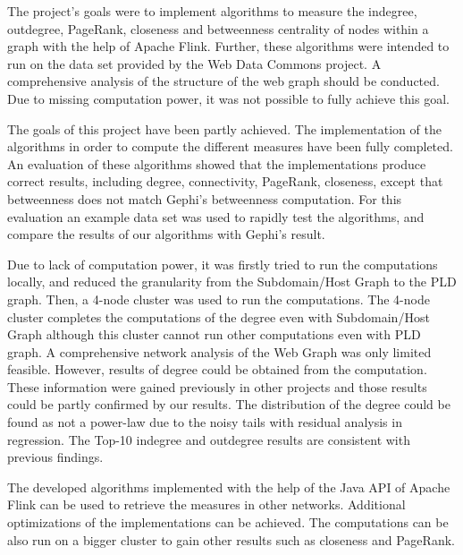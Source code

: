 The project's goals were to implement algorithms to measure the indegree, outdegree, PageRank, closeness and betweenness centrality of nodes within a graph with the  help of Apache Flink. Further, these algorithms were intended to run on the data set provided by the Web Data Commons project. A comprehensive analysis of the structure of the web graph should be conducted. Due to missing computation power, it was not possible to fully achieve this goal.

The goals of this project have been partly achieved. The implementation of the algorithms in order to compute the different measures have been fully completed. An evaluation of these algorithms showed that the implementations produce correct results, including degree, connectivity, PageRank, closeness, except that betweenness does not match Gephi's betweenness computation. For this evaluation an example data set was used to rapidly test the algorithms, and compare the results of our algorithms with Gephi's result. 

Due to lack of computation power, it was firstly tried to run the computations locally, and reduced the granularity from the Subdomain/Host Graph to the PLD graph. Then, a 4-node cluster was used to run the computations. The 4-node cluster completes the computations of the degree even with Subdomain/Host Graph although this cluster cannot run other computations even with PLD graph. A comprehensive network analysis of the Web Graph was only limited feasible. However, results of degree could be obtained from the computation. These information were gained previously in other projects and those results could be partly confirmed by our results. The distribution of the degree could be found as not a power-law due to the noisy tails with residual analysis in regression. The Top-10 indegree and outdegree results are consistent with previous findings.

The developed algorithms implemented with the help of the Java API of Apache Flink can be used to retrieve the measures in other networks. Additional optimizations of the implementations can be achieved. The computations can be also run on a bigger cluster to gain other results such as closeness and PageRank. 